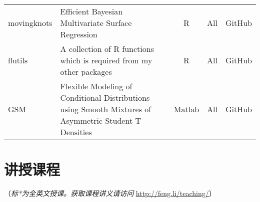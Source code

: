 \documentclass[twoside,a4paper,11pt]{article}
\begin{document}
\begin{tabular}{lp{9cm}ccl}
movingknots & Efficient Bayesian Multivariate Surface Regression                                                                   & R        & All         & GitHub       \\
flutils     & A collection of R functions which is required from my other packages                                                 & R        & All         & GitHub       \\
GSM         & Flexible Modeling of Conditional Distributions using Smooth Mixtures of Asymmetric Student T Densities               & Matlab   & All         & GitHub       \\
  \bottomrule
\end{tabular}



\section*{讲授课程}
（\emph{标*为全英文授课。获取课程讲义请访问} \url{http://feng.li/teaching/}）
\end{document}
